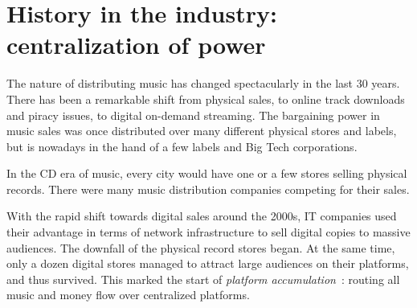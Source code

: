 


\section{History in the industry: centralization of power}
The nature of distributing music has changed spectacularly in the last 30 years. There has been a remarkable shift from physical sales, to online track downloads and piracy issues, to digital on-demand streaming. The bargaining power in music sales was once distributed over many different physical stores and labels, but is nowadays in the hand of a few labels and Big Tech corporations. 

In the CD era of music, every city would have one or a few stores selling physical records. There were many music distribution companies competing for their sales.

With the rapid shift towards digital sales around the 2000s, IT companies used their advantage in terms of network infrastructure to sell digital copies to massive audiences. The downfall of the physical record stores began. At the same time, only a dozen digital stores managed to attract large audiences on their platforms, and thus survived. This marked the start of \textit{platform accumulation}~\citep{meier2019rising}: routing all music and money flow over centralized platforms.


